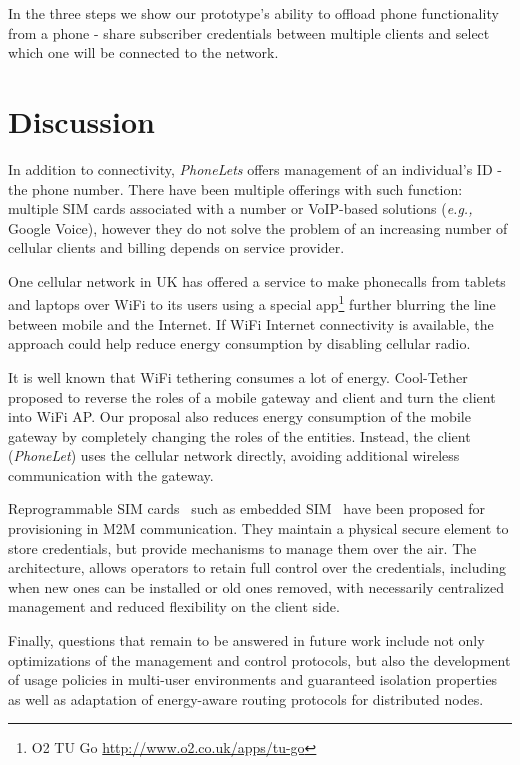 \documentclass{sig-alternate-2013}
\providecommand{\eg}{\emph{e.g.,} }
\begin{document}
In the three steps we show our prototype's ability to offload phone functionality from a phone - share subscriber credentials between multiple clients and select which one will be connected to the network.

\section{Discussion}

In addition to connectivity, \emph{PhoneLets} offers management of an individual's ID - the phone number. There have been multiple offerings with such function: multiple SIM cards associated with a number or VoIP-based solutions (\eg Google Voice), however they do not solve the problem of an increasing number of cellular clients and billing depends on service provider.

One cellular network in UK has offered a service to make phonecalls from tablets and laptops over WiFi to its users using a special app\footnote{O2 TU Go \url{http://www.o2.co.uk/apps/tu-go}} further blurring the line between mobile and the Internet. If WiFi Internet connectivity is available, the approach could help reduce energy consumption by disabling cellular radio.

It is well known that WiFi tethering consumes a lot of energy. Cool-Tether~\cite{Sharma:2009fd} proposed to reverse the roles of a mobile gateway and client and turn the client into WiFi AP. Our proposal also reduces energy consumption of the mobile gateway by completely changing the roles of the entities. Instead, the client (\emph{PhoneLet}) uses the cellular network directly, avoiding additional wireless communication with the gateway.

Reprogrammable SIM cards~\cite{OFcom:2012tx} such as embedded SIM~\cite{Association:2013ub} have been proposed for provisioning in M2M communication. They maintain a physical secure element to store credentials, but provide mechanisms to manage them over the air. The architecture, allows operators to retain full control over the credentials, including when new ones can be installed or old ones removed, with necessarily centralized management and reduced flexibility on the client side.

Finally, questions that remain to be answered in future work include not only optimizations of the management and control protocols, but also the development of usage policies in multi-user environments and guaranteed isolation properties as well as adaptation of energy-aware routing protocols for distributed nodes.
\end{document}
